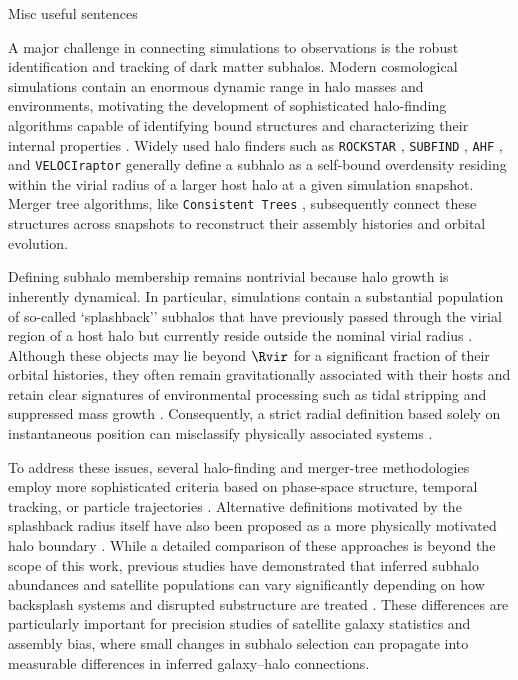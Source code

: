 Misc useful sentences

A major challenge in connecting simulations to observations is the robust identification and tracking of dark matter subhalos. Modern cosmological simulations contain an enormous dynamic range in halo masses and environments, motivating the development of sophisticated halo-finding algorithms capable of identifying bound structures and characterizing their internal properties \citep[e.g.][]{Knebe.etal.11, Onions.etal.12}. Widely used halo finders such as \texttt{ROCKSTAR} \citep{Behroozi.etal.13a}, \texttt{SUBFIND} \citep{Springel.etal.01}, \texttt{AHF} \citep{Knollmann.Knebe.09}, and \texttt{VELOCIraptor} \citep{Elahi.etal.19} generally define a subhalo as a self-bound overdensity residing within the virial radius of a larger host halo at a given simulation snapshot. Merger tree algorithms, like \texttt{Consistent Trees} \citep{Behroozi.etal.13b}, subsequently connect these structures across snapshots to reconstruct their assembly histories and orbital evolution.

Defining subhalo membership remains nontrivial because halo growth is inherently dynamical. In particular, simulations contain a substantial population of so-called `splashback'' subhalos that have previously passed through the virial region of a host halo but currently reside outside the nominal virial radius \citep{More.etal.16, Diemer.etal.17, Haggar.etal.20}. Although these objects may lie beyond $\Rvir$ for a significant fraction of their orbital histories, they often remain gravitationally associated with their hosts and retain clear signatures of environmental processing such as tidal stripping and suppressed mass growth \citep{}. Consequently, a strict radial definition based solely on instantaneous position can misclassify physically associated systems \citep{Mansfield.etal.17}.

To address these issues, several halo-finding and merger-tree methodologies employ more sophisticated criteria based on phase-space structure, temporal tracking, or particle trajectories \citep[e.g.][]{Behroozi.etal.13, Elahi.etal.19, Han.etal.18}. Alternative definitions motivated by the splashback radius itself have also been proposed as a more physically motivated halo boundary \citep{More.etal.15, Diemer.Kravtsov.14, Diemer.17}. While a detailed comparison of these approaches is beyond the scope of this work, previous studies have demonstrated that inferred subhalo abundances and satellite populations can vary significantly depending on how backsplash systems and disrupted substructure are treated \citep{Wetzel.etal.14, Mansfield.etal.17, Haggar.etal.20}. These differences are particularly important for precision studies of satellite galaxy statistics and assembly bias, where small changes in subhalo selection can propagate into measurable differences in inferred galaxy--halo connections.



